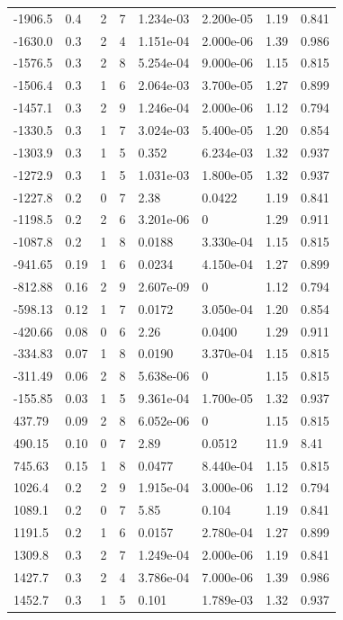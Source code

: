 \documentclass[preview]{standalone}
\begin{document}
{{\begin{tabular}{L{1.2cm}C{1.2cm} C{0.3cm}C{0.5cm} C{1.4cm}C{1.4cm} C{1.4cm}C{1.4cm}}
  -1906.5  &   0.4  & 2     &  7 &  1.234e-03  & 2.200e-05  & 1.19 &  0.841   \\ 
  -1630.0  &   0.3  & 2     &  4 &  1.151e-04  & 2.000e-06  & 1.39 &  0.986   \\ 
  -1576.5  &   0.3  & 2     &  8 &  5.254e-04  & 9.000e-06  & 1.15 &  0.815   \\ 
  -1506.4  &   0.3  & 1     &  6 &  2.064e-03  & 3.700e-05  & 1.27 &  0.899   \\ 
  -1457.1  &   0.3  & 2     &  9 &  1.246e-04  & 2.000e-06  & 1.12 &  0.794   \\ 
  -1330.5  &   0.3  & 1     &  7 &  3.024e-03  & 5.400e-05  & 1.20 &  0.854   \\ 
  -1303.9  &   0.3  & 1     &  5 &  0.352  & 6.234e-03  & 1.32 &  0.937   \\ 
  -1272.9  &   0.3  & 1     &  5 &  1.031e-03  & 1.800e-05  & 1.32 &  0.937   \\ 
  -1227.8  &   0.2  & 0     &  7 &  2.38  & 0.0422  & 1.19 &  0.841   \\ 
  -1198.5  &   0.2  & 2     &  6 &  3.201e-06  & 0  & 1.29 &  0.911   \\ 
  -1087.8  &   0.2  & 1     &  8 &  0.0188  & 3.330e-04  & 1.15 &  0.815   \\ 
  -941.65  &  0.19  & 1     &  6 &  0.0234  & 4.150e-04  & 1.27 &  0.899   \\ 
  -812.88  &  0.16  & 2     &  9 &  2.607e-09  & 0  & 1.12 &  0.794   \\ 
  -598.13  &  0.12  & 1     &  7 &  0.0172  & 3.050e-04  & 1.20 &  0.854   \\ 
  -420.66  &  0.08  & 0     &  6 &  2.26  & 0.0400  & 1.29 &  0.911   \\ 
  -334.83  &  0.07  & 1     &  8 &  0.0190  & 3.370e-04  & 1.15 &  0.815   \\ 
  -311.49  &  0.06  & 2     &  8 &  5.638e-06  & 0  & 1.15 &  0.815   \\ 
  -155.85  &  0.03  & 1     &  5 &  9.361e-04  & 1.700e-05  & 1.32 &  0.937   \\ 
  437.79  &  0.09  & 2     &  8 &  6.052e-06  & 0  & 1.15 &  0.815   \\ 
  490.15  &  0.10  & 0     &  7 &  2.89  & 0.0512  & 11.9 &  8.41   \\ 
  745.63  &  0.15  & 1     &  8 &  0.0477  & 8.440e-04  & 1.15 &  0.815   \\ 
  1026.4  &   0.2  & 2     &  9 &  1.915e-04  & 3.000e-06  & 1.12 &  0.794   \\ 
  1089.1  &   0.2  & 0     &  7 &  5.85  & 0.104  & 1.19 &  0.841   \\ 
  1191.5  &   0.2  & 1     &  6 &  0.0157  & 2.780e-04  & 1.27 &  0.899   \\ 
  1309.8  &   0.3  & 2     &  7 &  1.249e-04  & 2.000e-06  & 1.19 &  0.841   \\ 
  1427.7  &   0.3  & 2     &  4 &  3.786e-04  & 7.000e-06  & 1.39 &  0.986   \\ 
  1452.7  &   0.3  & 1     &  5 &  0.101  & 1.789e-03  & 1.32 &  0.937   \\ 
\hline 
\end{tabular} 

}}
\end{document}
